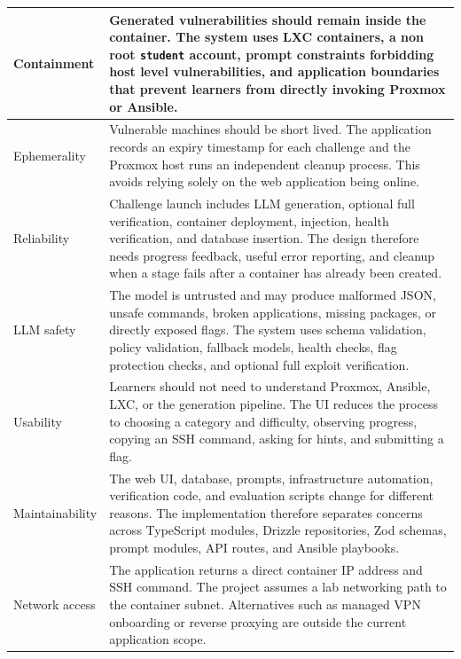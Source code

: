 \begin{longtable}{|p{}|p{}|}
	Containment         & Generated vulnerabilities should remain inside the container. The system uses LXC containers, a non root \lstinline|student| account, prompt constraints forbidding host level vulnerabilities, and application boundaries that prevent learners from directly invoking Proxmox or Ansible.          \\
	\hline
	Ephemerality        & Vulnerable machines should be short lived. The application records an expiry timestamp for each challenge and the Proxmox host runs an independent cleanup process. This avoids relying solely on the web application being online.                                                                  \\
	\hline
	Reliability         & Challenge launch includes LLM generation, optional full verification, container deployment, injection, health verification, and database insertion. The design therefore needs progress feedback, useful error reporting, and cleanup when a stage fails after a container has already been created. \\
	\hline
	LLM safety          & The model is untrusted and may produce malformed JSON, unsafe commands, broken applications, missing packages, or directly exposed flags. The system uses schema validation, policy validation, fallback models, health checks, flag protection checks, and optional full exploit verification.      \\
	\hline
	Usability           & Learners should not need to understand Proxmox, Ansible, LXC, or the generation pipeline. The UI reduces the process to choosing a category and difficulty, observing progress, copying an SSH command, asking for hints, and submitting a flag.                                                     \\
	\hline
	Maintainability     & The web UI, database, prompts, infrastructure automation, verification code, and evaluation scripts change for different reasons. The implementation therefore separates concerns across TypeScript modules, Drizzle repositories, Zod schemas, prompt modules, API routes, and Ansible playbooks.   \\
	\hline
	Network access      & The application returns a direct container IP address and SSH command. The project assumes a lab networking path to the container subnet. Alternatives such as managed VPN onboarding or reverse proxying are outside the current application scope.                                                 \\
	\hline
\end{longtable}

